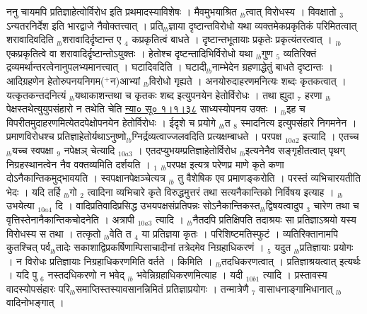 \documentclass[article,12pt,a4paper]{memoir}%
\newcommand{\add}[1]{($^{+}$#1)}
\begin{document}
	  
	  \pstart \leavevmode%
	ननु चायमपि प्रतिज्ञाहेत्वोर्विरोध इति प्रथमादस्याविशेषः । मैवमुभयाश्रित {\tiny $_{lb}$}त्वात् विरोधस्य । विवक्षातो {\tiny $_{3}$} ऽन्यतरनिर्देश इति {\color{DodgerBlue3}भारद्वाजे} नैवोक्तत्त्वात् । प्रति{\tiny $_{lb}$}ज्ञाया दृष्टान्तविरोधो यथा व्यक्तमेकप्रकृतिकं परिमितत्वात् शरावादिवदिति {\tiny $_{lb}$}शरावादिर्दृष्टान्त ए {\tiny $_{4}$} कप्रकृतित्वं बाधते । दृष्टान्तभूतायाः प्रकृतेः प्रकृत्यंतरत्वात् । {\tiny $_{lb}$}एकप्रकृतित्वे वा शरावादिर्दृष्टान्तोऽयुक्तः । हेतोश्च दृष्टन्तादिभिर्विरोधो यथा {\tiny $_{lb}$}गुण {\tiny $_{5}$} व्यतिरिक्तं द्रव्यमर्थान्तरत्वेनानुपलभ्यमानत्त्वात् । घटादिवदिति । घटादी{\tiny $_{lb}$}नाम्भेदेन ग्रहणाद्धेतुं बाधते दृष्टान्तः । आदिग्रहणेन हेतोरुपनयनिगम\add{न}आभ्यां {\tiny $_{lb}$}विरोधो गृह्यते । अनयोरुदाहरणमनित्यः शब्दः कृतकत्वात् । यत्कृतकन्तदनित्यं {\tiny $_{lb}$}यथाकाशन्तथा च कृतकः शब्द इत्युपनयेन हेतोर्विरोधः । तथा ह्युदा {\tiny $_{7}$} हरणा {\tiny $_{lb}$}पेक्षस्तथेत्युयुपसंहारो न तथेति चेति \href{http://sarit.indology.info/?cref=ns\%C5\%AB.1.1.38}{न्या० सू० १।१।३८} साध्यस्योपनय उक्तः । {\tiny $_{lb}$}इह च विपरीतमुदाहरणमित्येतदपेक्षोपनयेन हेतोर्विरोधः । ईदृशे च प्रयोगे {\tiny $_{lb}$}त {\tiny $_{8}$} स्मादनित्य इत्युपसंहारे निगमनेन । प्रमाणविरोधश्च प्रतिज्ञाहेतोर्यथाऽनुष्णो{\tiny $_{lb}$}ग्निर्द्रव्यत्वाज्जलवदिति प्रत्यक्षम्बाधते । {\color{DodgerBlue3}परपक्ष} {\tiny $_{10a2}$} इत्यादि । एतच्च {\tiny $_{lb}$}यच्च {\color{DodgerBlue3}स्वपक्षा {\tiny $_{9}$}\leavevmode{} नपेक्षञ्} चेत्यादि {\tiny $_{10a3}$} । एतदप्युभयम्प्रतिज्ञाहेतोर्विरोध {\tiny $_{lb}$}इत्यनेनैव सङ्गृहीतत्वात् पृथग् निग्रहस्थानत्वेन नैव वक्तव्यमिति दर्शयति । {\tiny $_{1}$} {\tiny $_{lb}$}परपक्ष इत्यत्र परेणप्र माणे कृते {\color{DodgerBlue3}कणा} दोऽनैकान्तिकमुद्भावयति । स्वपक्षानपेक्षञ्चेत्यत्र {\tiny $_{lb}$} \leavevmode{} तु {\color{DodgerBlue3}वैशेषिक} एव प्रमाणङ्करोति । परस्तं व्यभिचारयतीति भेदः । यदि तर्हि {\tiny $_{lb}$}गो {\tiny $_{2}$} त्वादिना व्यभिचारे कृते विरुद्धमुत्तरं तथा सत्यनैकान्तिको निर्विषय इत्याह । {\tiny $_{lb}$} {\color{DodgerBlue3}उभयेत्या {\tiny $_{10a4}$} दि} । वादिप्रतिवादिप्रसिद्ध उभयपक्षसंप्रतिपन्नः सोऽनैकान्तिकस्त{\tiny $_{lb}$}द्विषयत्वादुप {\tiny $_{3}$} चारेण तथा च वृत्तिस्तेनानैकान्तिकचोदनेति । {\color{DodgerBlue3}अत्रापी} {\tiny $_{10a3}$} त्यादि । {\tiny $_{lb}$}नैतदपि प्रतिक्षिपति तदाश्रयः सा प्रतिज्ञाऽश्रयो यस्य विरोधस्य स तथा । तत्कृतो {\tiny $_{lb}$}वेति त {\tiny $_{4}$} या प्रतिज्ञया कृतः । परिशिष्टमतिस्फुटं । व्यतिरिक्तानामपि कुतश्चित् पर्व{\tiny $_{lb}$}तादेः सकाशाद्विप्रकर्षिणाम्पिसाचादीनां तत्रेदमेव निग्रहाधिकरणं । {\tiny $_{5}$} यदुत {\tiny $_{lb}$}प्रतिज्ञायाः प्रयोगः । न विरोधः प्रतिज्ञायाः निग्रहाधिकरणमिति वर्तते । किमिति । {\tiny $_{lb}$}तदधिकरणत्वात् । प्रतिज्ञाश्रयत्वात् इत्यर्थः । यदि पु {\tiny $_{6}$} नस्तदधिकरणो न भवेद् {\tiny $_{lb}$} \leavevmode{} भवेन्निग्रहाधिकरणमित्याह । {\color{DodgerBlue3}यदी} {\tiny $_{10b1}$} त्यादि । प्रस्तावस्य वादस्योपसंहारः परि{\tiny $_{lb}$}समाप्तिस्तस्यावसानन्निमितं प्रतिज्ञाप्रयोगः । तन्मात्रेणै {\tiny $_{7}$} वासाधनाङ्गाभिधानात् {\tiny $_{lb}$}वादिनोभङ्गात् । 
\end{document}
